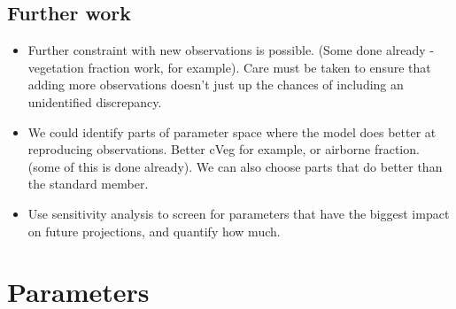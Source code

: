 \documentclass[gmd, manuscript]{copernicus}
\begin{document}
\subsection{Further work}\label{ssec:further_work}

\begin{itemize}
    \item Further constraint with new observations is possible. (Some done already - vegetation fraction work, for example). Care must be taken to ensure that adding more observations doesn't just up the chances of including an unidentified discrepancy.
    \item We could identify parts of parameter space where the model does better at reproducing observations. Better cVeg for example, or airborne fraction. (some of this is done already). We can also choose parts that do better than the standard member.
    \item Use sensitivity analysis to screen for parameters that have the biggest impact on future projections, and quantify how much. 
    
    
\end{itemize}












\appendix

\section{Parameters}\label{sec:app_parameters}
\end{document}
